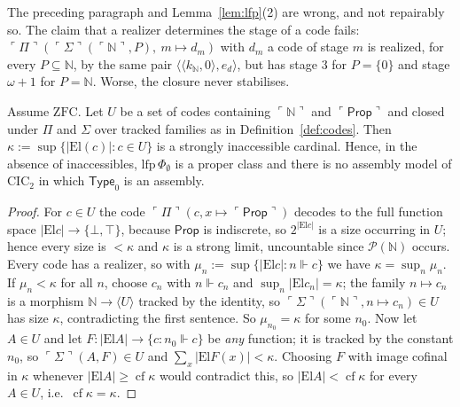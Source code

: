\documentclass[10pt]{article}
\newcommand{\N}{\mathbb{N}}
\newcommand{\Prop}{\mathsf{Prop}}
\newcommand{\Type}{\mathsf{Type}}
\newcommand{\CIC}{\mathrm{CIC}}
\newcommand{\ZFC}{\mathrm{ZFC}}
\newcommand{\code}[1]{\ulcorner #1\urcorner}
\newcommand{\El}{\mathrm{El}}
\newcommand{\rz}{\Vdash}
\newcommand{\PP}{\mathcal{P}}
\begin{document}
The preceding paragraph and Lemma~\ref{lem:lfp}(2) are wrong, and not
repairably so. The claim that a realizer determines the stage of a code
fails: $\code\Pi(\code\Sigma(\code\N,P),\ m\mapsto d_m)$ with $d_m$ a code
of stage $m$ is realized, for every $P\subseteq\N$, by the same pair
$\langle\langle k_\N,0\rangle,e_d\rangle$, but has stage $3$ for
$P=\{0\}$ and stage $\omega+1$ for $P=\N$. Worse, the closure never
stabilises.

\begin{proposition}\label{prop:noset}
Assume $\ZFC$. Let $U$ be a set of codes containing $\code\N$ and
$\code\Prop$ and closed under $\Pi$ and $\Sigma$ over tracked families as
in Definition~\ref{def:codes}. Then $\kappa:=\sup\{|\El(c)|:c\in U\}$ is a
strongly inaccessible cardinal. Hence, in the absence of inaccessibles,
$\mathrm{lfp}\,\Phi_\emptyset$ is a proper class and there is no assembly
model of $\CIC_2$ in which $\Type_0$ is an assembly.
\end{proposition}
\begin{proof}
For $c\in U$ the code $\code\Pi(c,x\mapsto\code\Prop)$ decodes to the full
function space $|\El c|\to\{\bot,\top\}$, because $\Prop$ is indiscrete,
so $2^{|\El c|}$ is a size occurring in $U$; hence every size is $<\kappa$
and $\kappa$ is a strong limit, uncountable since $\PP(\N)$ occurs. Every
code has a realizer, so with $\mu_n:=\sup\{|\El c|:n\rz c\}$ we have
$\kappa=\sup_n\mu_n$. If $\mu_n<\kappa$ for all $n$, choose
$c_n$ with $n\rz c_n$ and $\sup_n|\El c_n|=\kappa$; the family
$n\mapsto c_n$ is a morphism $\N\to\langle U\rangle$ tracked by the
identity, so $\code\Sigma(\code\N,n\mapsto c_n)\in U$ has size $\kappa$,
contradicting the first sentence. So $\mu_{n_0}=\kappa$ for some $n_0$.
Now let $A\in U$ and let $F:|\El A|\to\{c:n_0\rz c\}$ be \emph{any}
function; it is tracked by the constant $n_0$, so
$\code\Sigma(A,F)\in U$ and $\sum_x|\El F(x)|<\kappa$. Choosing $F$ with
image cofinal in $\kappa$ whenever $|\El A|\ge\operatorname{cf}\kappa$
would contradict this, so $|\El A|<\operatorname{cf}\kappa$ for every
$A\in U$, i.e.\ $\operatorname{cf}\kappa=\kappa$.
\end{proof}
\end{document}

